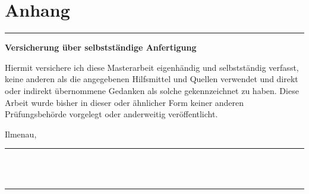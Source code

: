 \documentclass[%
	paper=a4,
	fontsize=11pt,
	pagesize,
	headings=small,
	twoside=false,
	bibliography=totocnumbered,
	index=totoc,
	listof=numbered,
	chapterprefix,
	DIV=15,
	numbers=noenddot,
	version=first
]{scrreprt}
\begin{document}
  \setcounter{page}{0}
  
  \listoftodos
  \newpage
  
  \newpage
  \tableofcontents
  
  
  
  
  
  
  
  \part*{Anhang}
  \appendix
  \printbibliography
  

  \newpage
  {\color{thillux-grey}\rule{\textwidth}{1pt}}
  \begin{center}
  \large\sffamily\textbf{Versicherung über selbstständige Anfertigung}
  \end{center}

  Hiermit versichere ich diese Masterarbeit eigenhändig und selbstständig verfasst, keine anderen als die angegebenen Hilfsmittel und Quellen verwendet und direkt oder indirekt übernommene Gedanken als solche gekennzeichnet zu haben.
  Diese Arbeit wurde bisher in dieser oder ähnlicher Form keiner anderen Prüfungsbehörde vorgelegt oder anderweitig veröffentlicht.
  \vspace{3em}
  \begin{center}
  Ilmenau, \eingereichtAm \hfill \rule{15em}{0.5pt}\\\hspace{\textwidth}\hspace{-15em} \NameDesAutors\\[1em]
  {\color{thillux-grey}\rule{\textwidth}{1pt}}
  \end{center}
\end{document}
